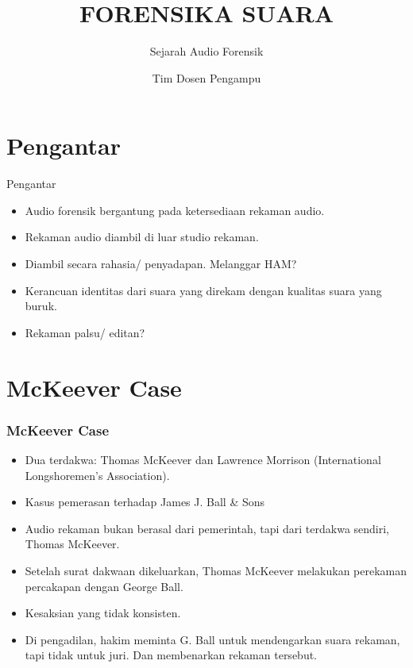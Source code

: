 \documentclass[pdflatex,compress]{beamer}
\title{FORENSIKA SUARA}
\subtitle{Sejarah Audio Forensik}
\author{Tim Dosen Pengampu}
\begin{document}
\maketitle

\section{Pengantar}

\begin{frame}{Pengantar}
	\begin{itemize}
		\item Audio forensik bergantung pada ketersediaan rekaman audio.
		\item Rekaman audio diambil di luar studio rekaman.
		\item Diambil secara rahasia/ penyadapan. Melanggar HAM?
		\item Kerancuan identitas dari suara yang direkam dengan kualitas suara yang buruk.
		\item Rekaman palsu/ editan?
	\end{itemize}
\end{frame}

\section{McKeever Case}

\begin{frame}
	\frametitle{McKeever Case}
	\begin{itemize}
		\item Dua terdakwa: Thomas McKeever dan Lawrence Morrison (International Longshoremen's Association).
		\item Kasus pemerasan terhadap James J. Ball \& Sons
		\item Audio rekaman bukan berasal dari pemerintah, tapi dari terdakwa sendiri, Thomas McKeever.
		\item Setelah surat dakwaan dikeluarkan, Thomas McKeever melakukan perekaman percakapan dengan George Ball.
		\item Kesaksian yang tidak konsisten.
		\item Di pengadilan, hakim meminta G. Ball untuk mendengarkan suara rekaman, tapi tidak untuk juri. Dan membenarkan rekaman tersebut.
	\end{itemize}
\end{frame}
\end{document}
